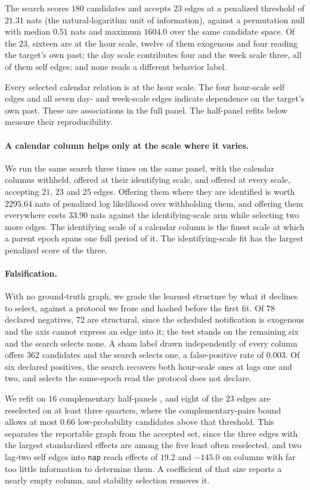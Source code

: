 \documentclass[sigconf]{acmart}
\begin{document}
The search scores $180$ candidates and accepts $23$ edges at a penalized threshold of $21.31$ nats (the natural-logarithm unit of information), against a permutation null with median $0.51$ nats and maximum $1604.0$ over the same candidate space. Of the $23$, sixteen are at the hour scale, twelve of them exogenous and four reading the target's own past; the day scale contributes four and the week scale three, all of them self edges; and none reads a different behavior label.

Every selected calendar relation is at the hour scale. The four hour-scale self edges and all seven day- and week-scale edges indicate dependence on the target's own past. These are associations in the full panel. The half-panel refits below measure their reproducibility.

\paragraph{A calendar column helps only at the scale where it varies.} We run the same search three times on the same panel, with the calendar columns withheld, offered at their identifying scale, and offered at every scale, accepting $21$, $23$ and $25$ edges. Offering them where they are identified is worth $2295.64$ nats of penalized log likelihood over withholding them, and offering them everywhere costs $33.90$ nats against the identifying-scale arm while selecting two more edges. The identifying scale of a calendar column is the finest scale at which a parent epoch spans one full period of it. The identifying-scale fit has the largest penalized score of the three.

\paragraph{Falsification.} With no ground-truth graph, we grade the learned structure by what it declines to select, against a protocol we froze and hashed before the first fit. Of $78$ declared negatives, $72$ are structural, since the scheduled notification is exogenous and the axis cannot express an edge into it; the test stands on the remaining six and the search selects none. A sham label drawn independently of every column offers $362$ candidates and the search selects one, a false-positive rate of $0.003$. Of six declared positives, the search recovers both hour-scale ones at lags one and two, and selects the same-epoch read the protocol does not declare.

We refit on $16$ complementary half-panels \citep{meinshausen_stability_2010}, and eight of the $23$ edges are reselected on at least three quarters, where the complementary-pairs bound allows at most $0.66$ low-probability candidates above that threshold. This separates the reportable graph from the accepted set, since the three edges with the largest standardized effects are among the five least often reselected, and two lag-two self edges into \texttt{nap} reach effects of $19.2$ and $-145.0$ on columns with far too little information to determine them. A coefficient of that size reports a nearly empty column, and stability selection removes it.
\end{document}

